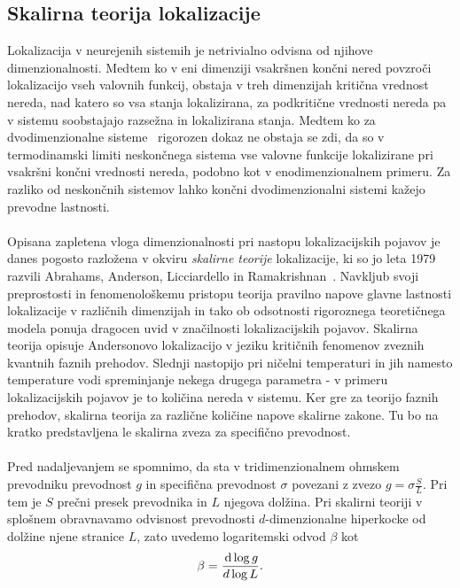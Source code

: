 \subsection{Skalirna teorija lokalizacije}
Lokalizacija v neurejenih sistemih je netrivialno odvisna od njihove dimenzionalnosti. Medtem ko v eni dimenziji vsakršnen končni nered povzroči lokalizacijo vseh valovnih funkcij, obstaja v treh dimenzijah kritična vrednost nereda, nad katero so vsa stanja lokalizirana, za podkritične vrednosti nereda pa v sistemu soobstajajo razsežna in lokalizirana stanja. Medtem ko za dvodimenzionalne sisteme~\cite{kramer1993localization} rigorozen dokaz ne obstaja se zdi, da so v termodinamski limiti neskončnega sistema vse valovne funkcije lokalizirane pri vsakršni končni vrednosti nereda, podobno kot v enodimenzionalnem primeru. Za razliko od neskončnih sistemov lahko končni dvodimenzionalni sistemi kažejo prevodne lastnosti. \\\\ 
Opisana zapletena vloga dimenzionalnosti pri nastopu lokalizacijskih pojavov je danes pogosto razložena v okviru \emph{skalirne teorije} lokalizacije, ki so jo leta 1979 razvili Abrahams, Anderson, Licciardello in Ramakrishnan~\cite{abrahams1979scaling}. Navkljub svoji preprostosti in fenomenološkemu pristopu teorija pravilno napove glavne lastnosti lokalizacije v različnih dimenzijah in tako ob odsotnosti rigoroznega teoretičnega modela ponuja dragocen uvid v značilnosti lokalizacijskih pojavov. Skalirna teorija opisuje Andersonovo lokalizacijo v jeziku kritičnih fenomenov zveznih kvantnih faznih prehodov. Slednji nastopijo pri ničelni temperaturi in jih namesto temperature vodi spreminjanje nekega drugega parametra - v primeru lokalizacijskih pojavov je to količina nereda v sistemu. Ker gre za teorijo faznih prehodov, skalirna teorija za različne količine napove skalirne zakone. Tu bo na kratko predstavljena le skalirna zveza za specifično prevodnost.\\\\
Pred nadaljevanjem se spomnimo, da sta v tridimenzionalnem ohmskem prevodniku prevodnost $g$ in specifična prevodnost $\sigma$ povezani z zvezo $g=\sigma\frac{S}{L}.$ Pri tem je $S$ prečni presek prevodnika in $L$ njegova dolžina. Pri skalirni teoriji v splošnem obravnavamo odvisnost prevodnosti $d$-dimenzionalne hiperkocke od dolžine njene stranice $L$, zato uvedemo logaritemski odvod $\beta$ kot 
\begin{equation}\label{eq:beta_log}
\beta=\frac{\,\mathrm{d} \log g}{\\d \log L}.
\end{equation}
